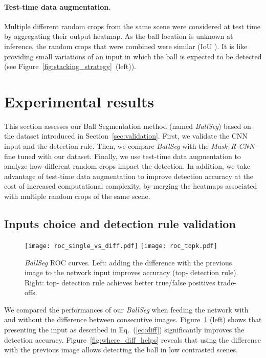 \documentclass[sigconf, screen]{acmart}
\begin{document}
\paragraph{Test-time data augmentation.}
Multiple different random crops from the same scene were considered at test time by aggregating their output heatmap. As the ball location is unknown at inference, the random crops that were combined were similar (IoU ). It is like providing small variations of an input in which the ball is expected to be detected (see Figure~\ref{fig:stacking_strategy}~(left)).



\section{Experimental results}
\label{sec:results}


This section assesses our Ball Segmentation method (named \emph{BallSeg}) based on the dataset introduced in Section~\ref{sec:validation}.
First, we validate the CNN input and the detection rule.
Then, we compare \emph{BallSeg} with the \emph{Mask~R-CNN} fine tuned with our dataset.
Finally, we use test-time data augmentation to analyze how different random crops impact the detection. In addition, we take advantage of test-time data augmentation to improve detection accuracy at the cost of increased computational complexity, by merging the heatmaps associated with multiple random crops of the same scene.

\subsection{Inputs choice and detection rule validation}

\begin{figure}
    \begin{center}
    \texttt{[image: roc\_single\_vs\_diff.pdf]}\hspace{2em}
    \texttt{[image: roc\_topk.pdf]}
    \end{center}
    \caption{\emph{BallSeg} ROC curves. Left: adding the difference with the previous image to the network input improves accuracy (top- detection rule). Right: top- detection rule achieves better true/false positives trade-offs.}
    \label{fig:roc_baseline}
\end{figure}

We compared the performances of our \emph{BallSeg} when feeding the network with and without the difference between consecutive images. Figure~\ref{fig:roc_baseline} (left) shows that presenting the input as described in Eq.~(\ref{eq:diff}) significantly improves the detection accuracy. Figure~\ref{fig:where_diff_helps} reveals that using the difference with the previous image allows detecting the ball in low contrasted scenes.
\end{document}
